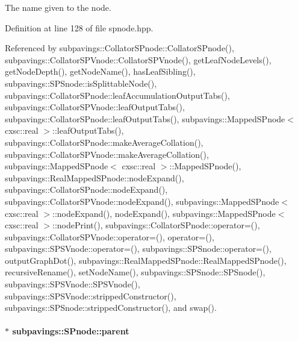 \-The name given to the node. 



\-Definition at line 128 of file spnode.\-hpp.



\-Referenced by subpavings\-::\-Collator\-S\-Pnode\-::\-Collator\-S\-Pnode(), subpavings\-::\-Collator\-S\-P\-Vnode\-::\-Collator\-S\-P\-Vnode(), get\-Leaf\-Node\-Levels(), get\-Node\-Depth(), get\-Node\-Name(), has\-Leaf\-Sibling(), subpavings\-::\-S\-P\-Snode\-::is\-Splittable\-Node(), subpavings\-::\-Collator\-S\-Pnode\-::leaf\-Accumulation\-Output\-Tabs(), subpavings\-::\-Collator\-S\-P\-Vnode\-::leaf\-Output\-Tabs(), subpavings\-::\-Collator\-S\-Pnode\-::leaf\-Output\-Tabs(), subpavings\-::\-Mapped\-S\-Pnode$<$ cxsc\-::real $>$\-::leaf\-Output\-Tabs(), subpavings\-::\-Collator\-S\-Pnode\-::make\-Average\-Collation(), subpavings\-::\-Collator\-S\-P\-Vnode\-::make\-Average\-Collation(), subpavings\-::\-Mapped\-S\-Pnode$<$ cxsc\-::real $>$\-::\-Mapped\-S\-Pnode(), subpavings\-::\-Real\-Mapped\-S\-Pnode\-::node\-Expand(), subpavings\-::\-Collator\-S\-Pnode\-::node\-Expand(), subpavings\-::\-Collator\-S\-P\-Vnode\-::node\-Expand(), subpavings\-::\-Mapped\-S\-Pnode$<$ cxsc\-::real $>$\-::node\-Expand(), node\-Expand(), subpavings\-::\-Mapped\-S\-Pnode$<$ cxsc\-::real $>$\-::node\-Print(), subpavings\-::\-Collator\-S\-Pnode\-::operator=(), subpavings\-::\-Collator\-S\-P\-Vnode\-::operator=(), operator=(), subpavings\-::\-S\-P\-S\-Vnode\-::operator=(), subpavings\-::\-S\-P\-Snode\-::operator=(), output\-Graph\-Dot(), subpavings\-::\-Real\-Mapped\-S\-Pnode\-::\-Real\-Mapped\-S\-Pnode(), recursive\-Rename(), set\-Node\-Name(), subpavings\-::\-S\-P\-Snode\-::\-S\-P\-Snode(), subpavings\-::\-S\-P\-S\-Vnode\-::\-S\-P\-S\-Vnode(), subpavings\-::\-S\-P\-S\-Vnode\-::stripped\-Constructor(), subpavings\-::\-S\-P\-Snode\-::stripped\-Constructor(), and swap().

\hypertarget{classsubpavings_1_1SPnode_ad39c8dad1a8fa89110da4bad250521d8}{
\paragraph[{parent}]{$\ast$ {\bf subpavings\-::\-S\-Pnode\-::parent}}}\label{classsubpavings_1_1SPnode_ad39c8dad1a8fa89110da4bad250521d8}


